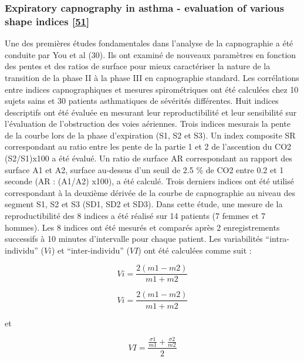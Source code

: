 \documentclass[12pt,]{article}
\begin{document}
\hypertarget{expiratory-capnography-in-asthma---evaluation-of-various-shape-indices-you1994expiratory}{%
\subsubsection{\texorpdfstring{Expiratory capnography in asthma -
evaluation of various shape indices
{[}\protect\hyperlink{ref-you1994expiratory}{51}{]}}{Expiratory capnography in asthma - evaluation of various shape indices {[}51{]}}}\label{expiratory-capnography-in-asthma---evaluation-of-various-shape-indices-you1994expiratory}}

Une des premières études fondamentales dans l'analyse de la capnographie
a été conduite par You et al (30). Ils ont examiné de nouveaux
paramètres en fonction des pentes et des ratios de surface pour mieux
caractériser la nature de la transition de la phase II à la phase III en
capnographie standard. Les corrélations entre indices capnographiques et
mesures spirométriques ont été calculées chez 10 sujets sains et 30
patients asthmatiques de sévérités différentes. Huit indices descriptifs
ont été évaluée en mesurant leur reproductibilité et leur sensibilité
sur l'évaluation de l'obstruction des voies aériennes. Trois indices
mesurais la pente de la courbe lors de la phase d'expiration (S1, S2 et
S3). Un index composite SR correspondant au ratio entre les pente de la
partie 1 et 2 de l'ascention du CO2 (S2/S1)x100 a été évalué. Un ratio
de surface AR correspondant au rapport des surface A1 et A2, surface
au-dessus d'un seuil de 2.5 \% de CO2 entre 0.2 et 1 seconde (AR :
(A1/A2) x100), a été calculé. Trois derniers indices ont été utilisé
correspondant à la deuxième dérivée de la courbe de capnographie au
niveau des segment S1, S2 et S3 (SD1, SD2 et SD3). Dans cette étude, une
mesure de la reproductibilité des 8 indices a été réalisé sur 14
patients (7 femmes et 7 hommes). Les 8 indices ont été mesurés et
comparés après 2 enregistrements successifs à 10 minutes d'intervalle
pour chaque patient. Les variabilités ``intra-individu'' (\(Vi\)) et
``inter-individu'' (\(VI\)) ont été calculées comme suit :

\[Vi=\frac{2(m1-m2)}{m1+m2}\]

\begin{equation}
  Vi=\frac{2(m1-m2)}{m1+m2}
\label{eq:Vi}
\end{equation}

et

\[VI=\frac{\frac{\sigma1}{m1}+\frac{\sigma2}{m2}}{2}\]
\end{document}
